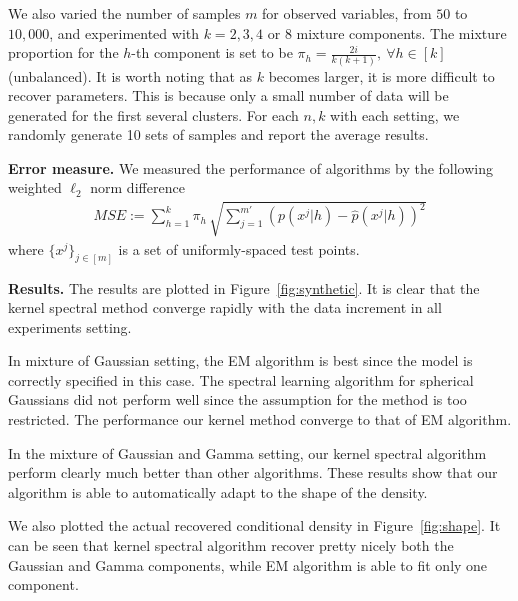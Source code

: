 \documentclass{article}
\begin{document}
We also varied the number of samples $m$ for observed variables, from $50$ to $10,000$, and
experimented with $k=2,3,4$ or $8$ mixture components. The mixture proportion for the $h$-th component is set to be $\pi_h= \frac{2i}{k(k+1)},~\forall h\in[k]$ (unbalanced). It is worth noting that as $k$ becomes larger, it is more difficult to recover parameters. This is because only a small number of data will be generated for the first several clusters. For each $n,k$ with each setting, we randomly generate 10 sets of samples and report the average results.

{\bf Error measure.} We measured the performance of algorithms by the
following weighted $\ell_2$ norm difference
\begin{align*}
  MSE:=\sum_{h=1}^{k} \pi_h\, \sqrt{\sum_{j=1}^{m'} (p(x^j|h) - \widehat{p}(x^j|h))^2 }
\end{align*}
where $\{x^j\}_{j\in[m]}$ is a set of uniformly-spaced test points.

{\bf Results.} The results are plotted in Figure~\ref{fig:synthetic}. It is clear that the kernel spectral method converge rapidly with the data increment in all experiments setting.

In mixture of Gaussian setting, the EM algorithm is best since the model is correctly specified in this case. The spectral learning algorithm for spherical Gaussians did not perform well since the assumption for the method is too restricted. The performance our kernel method converge to that of EM algorithm.

In the mixture of Gaussian and Gamma setting, our kernel spectral algorithm perform clearly much better than other algorithms. These results show that our algorithm is able to automatically adapt to the shape of the density.

We also plotted the actual recovered conditional density in Figure~\ref{fig:shape}. It can be seen that kernel spectral algorithm recover pretty nicely both the Gaussian and Gamma components, while EM algorithm is able to fit only one component.
\end{document}

